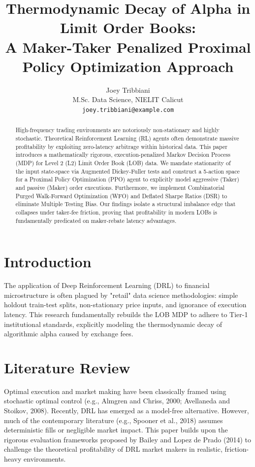 \documentclass[10pt,twocolumn,letterpaper]{article}
\title{\Large \bf Thermodynamic Decay of Alpha in Limit Order Books:\\A Maker-Taker Penalized Proximal Policy Optimization Approach}
\author{
Joey Tribbiani\\
M.Sc. Data Science, NIELIT Calicut\\
{\tt joey.tribbiani@example.com}
}
\date{}
\begin{document}
\maketitle

\begin{abstract}
High-frequency trading environments are notoriously non-stationary and highly stochastic. Theoretical Reinforcement Learning (RL) agents often demonstrate massive profitability by exploiting zero-latency arbitrage within historical data. This paper introduces a mathematically rigorous, execution-penalized Markov Decision Process (MDP) for Level 2 (L2) Limit Order Book (LOB) data. We mandate stationarity of the input state-space via Augmented Dickey-Fuller tests and construct a 5-action space for a Proximal Policy Optimization (PPO) agent to explicitly model aggressive (Taker) and passive (Maker) order executions. Furthermore, we implement Combinatorial Purged Walk-Forward Optimization (WFO) and Deflated Sharpe Ratios (DSR) to eliminate Multiple Testing Bias. Our findings isolate a structural imbalance edge that collapses under taker-fee friction, proving that profitability in modern LOBs is fundamentally predicated on maker-rebate latency advantages.
\end{abstract}

\section{Introduction}
The application of Deep Reinforcement Learning (DRL) to financial microstructure is often plagued by "retail" data science methodologies: simple holdout train-test splits, non-stationary price inputs, and ignorance of execution latency. This research fundamentally rebuilds the LOB MDP to adhere to Tier-1 institutional standards, explicitly modeling the thermodynamic decay of algorithmic alpha caused by exchange fees. 

\section{Literature Review}
Optimal execution and market making have been classically framed using stochastic optimal control (e.g., Almgren and Chriss, 2000; Avellaneda and Stoikov, 2008). Recently, DRL has emerged as a model-free alternative. However, much of the contemporary literature (e.g., Spooner et al., 2018) assumes deterministic fills or negligible market impact. This paper builds upon the rigorous evaluation frameworks proposed by Bailey and Lopez de Prado (2014) to challenge the theoretical profitability of DRL market makers in realistic, friction-heavy environments.
\end{document}
